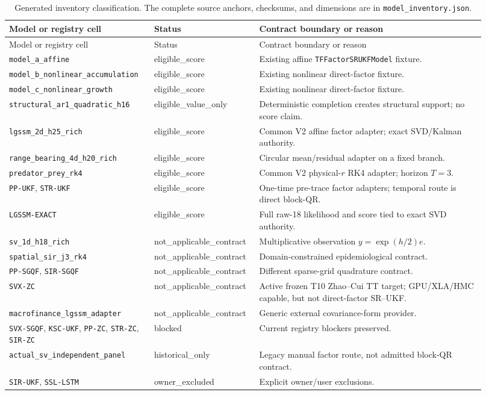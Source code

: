 \documentclass[11pt]{article}
\begin{document}
\begin{longtable}{p{0.29\linewidth}p{0.18\linewidth}p{0.45\linewidth}}
\caption{Generated inventory classification. The complete source anchors,
checksums, and dimensions are in \texttt{model\_inventory.json}.}\label{tab:inventory}\\
\toprule
Model or registry cell & Status & Contract boundary or reason \\
\midrule
\endfirsthead
\toprule
Model or registry cell & Status & Contract boundary or reason \\
\midrule
\endhead
\texttt{model\_a\_affine} & eligible\_score & Existing affine \texttt{TFFactorSRUKFModel} fixture. \\
\texttt{model\_b\_nonlinear\_accumulation} & eligible\_score & Existing nonlinear direct-factor fixture. \\
\texttt{model\_c\_nonlinear\_growth} & eligible\_score & Existing nonlinear direct-factor fixture. \\
\texttt{structural\_ar1\_quadratic\_h16} & eligible\_value\_only & Deterministic completion creates structural support; no score claim. \\
\texttt{lgssm\_2d\_h25\_rich} & eligible\_score & Common V2 affine factor adapter; exact SVD/Kalman authority. \\
\texttt{range\_bearing\_4d\_h20\_rich} & eligible\_score & Circular mean/residual adapter on a fixed branch. \\
\texttt{predator\_prey\_rk4} & eligible\_score & Common V2 physical-$r$ RK4 adapter; horizon $T=3$. \\
\texttt{PP-UKF}, \texttt{STR-UKF} & eligible\_score & One-time pre-trace factor adapters; temporal route is direct block-QR. \\
\texttt{LGSSM-EXACT} & eligible\_score & Full raw-18 likelihood and score tied to exact SVD authority. \\
\texttt{sv\_1d\_h18\_rich} & not\_applicable\_contract & Multiplicative observation $y=\exp(h/2)e$. \\
\texttt{spatial\_sir\_j3\_rk4} & not\_applicable\_contract & Domain-constrained epidemiological contract. \\
\texttt{PP-SGQF}, \texttt{SIR-SGQF} & not\_applicable\_contract & Different sparse-grid quadrature contract. \\
\texttt{SVX-ZC} & not\_applicable\_contract & Active frozen T10 Zhao--Cui TT target; GPU/XLA/HMC capable, but not direct-factor SR--UKF. \\
\texttt{macrofinance\_lgssm\_adapter} & not\_applicable\_contract & Generic external covariance-form provider. \\
\texttt{SVX-SGQF}, \texttt{KSC-UKF}, \texttt{PP-ZC}, \texttt{STR-ZC}, \texttt{SIR-ZC} & blocked & Current registry blockers preserved. \\
\texttt{actual\_sv\_independent\_panel} & historical\_only & Legacy manual factor route, not admitted block-QR contract. \\
\texttt{SIR-UKF}, \texttt{SSL-LSTM} & owner\_excluded & Explicit owner/user exclusions. \\
\bottomrule
\end{longtable}
\end{document}
